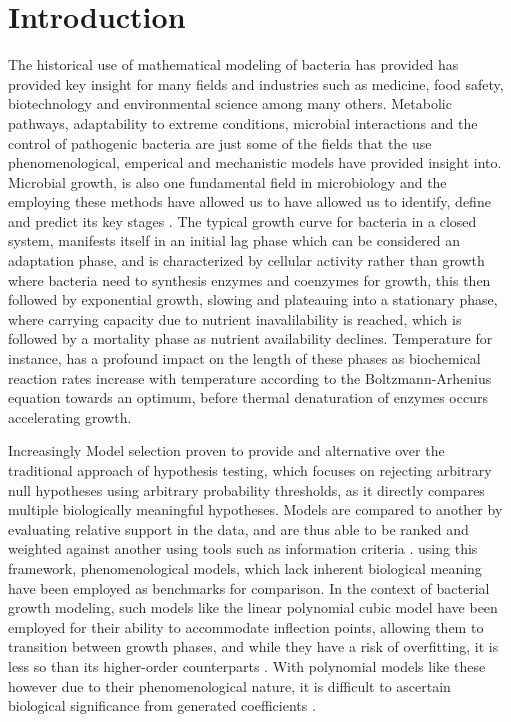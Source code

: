 \documentclass[11pt]{article}
\begin{document}
\section{Introduction}
The historical use of mathematical modeling of bacteria has provided has provided key insight for many fields and industries such as medicine, food safety, biotechnology and environmental science among many others. Metabolic pathways, adaptability to  extreme conditions, microbial interactions and the control of pathogenic bacteria are just some of the fields that the use phenomenological, emperical and mechanistic models have provided insight into. Microbial growth, is also one fundamental field in microbiology and the employing these methods have allowed us to have allowed us to identify, define and predict its key stages \cite{esser2015modeling}. The typical growth curve for bacteria in a closed system, manifests itself in an initial lag phase which can be considered an adaptation phase, and is characterized by cellular activity rather than growth where bacteria need to synthesis enzymes and coenzymes for growth, this then followed by exponential growth, slowing and plateauing into a stationary phase, where carrying capacity due to nutrient inavalilability is reached, which is followed by a mortality phase as nutrient availability declines\cite{Peleg01122011,maier2015bacterial,lo2023generalized}. Temperature for instance, has a profound impact on the length of these phases as biochemical reaction rates increase with temperature according to the Boltzmann-Arhenius equation towards an optimum, before thermal denaturation of enzymes occurs \cite{michaelis1913kinetik, zwietering1994modeling, dell2011systematic} accelerating growth.   
\setlength{\parskip}{1.2em} %

Increasingly Model selection proven to provide and alternative over the traditional approach of hypothesis testing, which focuses on rejecting arbitrary null hypotheses using arbitrary probability thresholds, as it directly compares multiple biologically meaningful hypotheses. Models are compared to another by evaluating relative support in the data, and are thus able to be ranked and weighted against another using tools such as information criteria \cite{johnson2004model}. using this framework, phenomenological models, which lack inherent biological meaning have been employed as benchmarks for comparison. In the context of bacterial growth modeling, such models like the linear polynomial cubic model have been employed for their ability to accommodate inflection points, allowing them to transition between growth phases, and while they have a risk of overfitting, it is less so than its higher-order counterparts \cite{garcia2021primary}. With polynomial models like these however due to their phenomenological nature, it is difficult to ascertain biological significance from generated coefficients \cite{Peleg01122011,motulsky2004fitting}.   
\end{document}
